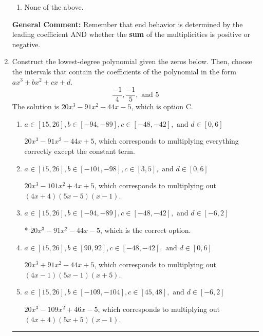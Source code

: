\documentclass{extbook}[14pt]
\newcommand{\litem}[1]{\item #1

\rule{\textwidth}{0.4pt}}
\begin{document}
\begin{enumerate}
{\begin{enumerate}[label=\Alph*.]
\item None of the above.\end{enumerate}
\textbf{General Comment:} Remember that end behavior is determined by the leading coefficient AND whether the \textbf{sum} of the multiplicities is positive or negative.
}
\litem{
Construct the lowest-degree polynomial given the zeros below. Then, choose the intervals that contain the coefficients of the polynomial in the form $ax^3+bx^2+cx+d$.
\[ \frac{-1}{4}, \frac{-1}{5}, \text{ and } 5 \]
The solution is \( 20x^{3} -91 x^{2} -44 x -5 \), which is option C.\begin{enumerate}[label=\Alph*.]
\item \( a \in [15, 26], b \in [-94, -89], c \in [-48, -42], \text{ and } d \in [0, 6] \)

$20x^{3} -91 x^{2} -44 x + 5$, which corresponds to multiplying everything correctly except the constant term.
\item \( a \in [15, 26], b \in [-101, -98], c \in [3, 5], \text{ and } d \in [0, 6] \)

$20x^{3} -101 x^{2} +4 x + 5$, which corresponds to multiplying out $(4x + 4)(5x -5)(x -1)$.
\item \( a \in [15, 26], b \in [-94, -89], c \in [-48, -42], \text{ and } d \in [-6, 2] \)

* $20x^{3} -91 x^{2} -44 x -5$, which is the correct option.
\item \( a \in [15, 26], b \in [90, 92], c \in [-48, -42], \text{ and } d \in [0, 6] \)

$20x^{3} +91 x^{2} -44 x + 5$, which corresponds to multiplying out $(4x -1)(5x -1)(x + 5)$.
\item \( a \in [15, 26], b \in [-109, -104], c \in [45, 48], \text{ and } d \in [-6, 2] \)

$20x^{3} -109 x^{2} +46 x -5$, which corresponds to multiplying out $(4x + 4)(5x + 5)(x -1)$.
\end{enumerate}

}
\end{enumerate}
\end{document}
